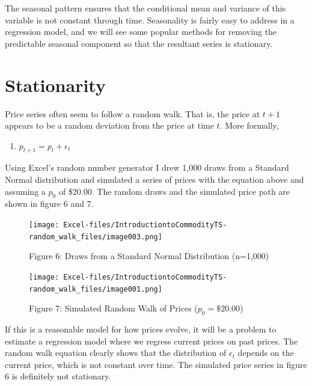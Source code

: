 \documentclass[
  letterpaper,
  DIV=11,
  numbers=noendperiod]{scrreprt}
\providecommand{\tightlist}{%
  \setlength{\itemsep}{0pt}\setlength{\parskip}{0pt}}\usepackage{longtable,booktabs,array}
\begin{document}
The seasonal pattern ensures that the conditional mean and variance of
this variable is not constant through time. Seasonality is fairly easy
to address in a regression model, and we will see some popular methods
for removing the predictable seasonal component so that the resultant
series is stationary.

\hypertarget{stationarity}{%
\section{Stationarity}\label{stationarity}}

Price series often seem to follow a random walk. That is, the price at
\(t+1\) appears to be a random deviation from the price at time \(t\).
More formally,

\begin{enumerate}
\def\labelenumi{(\arabic{enumi})}
\setcounter{enumi}{2}
\tightlist
\item
  \(p_{t+1} = p_{t} + \epsilon_t\)
\end{enumerate}

Using Excel's random number generator I drew 1,000 draws from a Standard
Normal distribution and simulated a series of prices with the equation
above and assuming a \(p_0\) of \$20.00. The random draws and the
simulated price path are shown in figure 6 and 7.

\begin{figure}

{\centering \texttt{[image: Excel-files/IntroductiontoCommodityTS-random\_walk\_files/image003.png]}

}

\caption{Figure 6: Draws from a Standard Normal Distribution (n=1,000)}

\end{figure}

\begin{figure}

{\centering \texttt{[image: Excel-files/IntroductiontoCommodityTS-random\_walk\_files/image001.png]}

}

\caption{Figure 7: Simulated Random Walk of Prices (\(p_0 = \$20.00\))}

\end{figure}

If this is a reasonable model for how prices evolve, it will be a
problem to estimate a regression model where we regress current prices
on past prices. The random walk equation clearly shows that the
distribution of \(\epsilon_t\) depends on the current price, which is
not constant over time. The simulated price series in figure 6 is
definitely not stationary.
\end{document}

